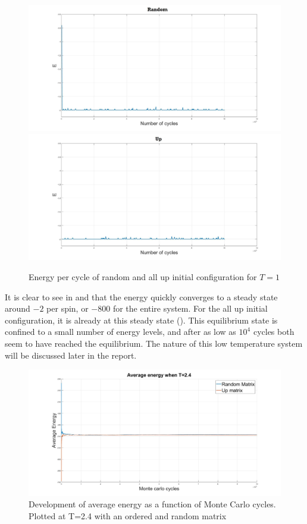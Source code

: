 \documentclass[10pt,a4paper]{article}
\begin{document}
\begin{figure} [H]
\centerline{
\includegraphics[scale=0.15]{RANDOMenergy1.jpg}
\includegraphics[scale=0.15]{UPenergy1.jpg}
}
\caption{Energy per cycle of random and all up initial configuration for $T=1$}
\label{fig:EnergyPerCycle1}
\end{figure}

\noindent It is clear to see in  and  that the energy quickly converges to a steady state around $-2$ per spin, or $-800$ for the entire system. For the all up initial configuration, it is already at this steady state (). This equilibrium state is confined to a small number of energy levels, and after as low as $10^4$ cycles both seem to have reached the equilibrium. The nature of this low temperature system will be discussed later in the report. 




\begin{figure} [H]
\centerline{
\includegraphics[scale=0.3]{avgEnergy24.jpg}
}
\caption{Development of average energy as a function of Monte Carlo cycles. Plotted at T=2.4 with an ordered and random matrix}
\label{fig:AverageEnergy24}
\end{figure}
\end{document}
